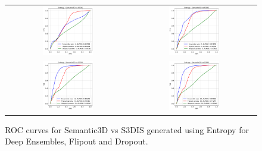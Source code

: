     \begin{figure}
        \centering
        \begin{tabular}{cc}
            \includegraphics[width = 0.42\textwidth, height= 0.3\textheight]{images/AUROC/Entropy_1.pdf} & 
            \includegraphics[width = 0.42\textwidth, height= 0.3\textheight]{images/AUROC/Entropy_5.pdf}\\ 
            
            \includegraphics[width = 0.42\textwidth, height= 0.3\textheight]{images/AUROC/Entropy_15.pdf} &
            \includegraphics[width = 0.42\textwidth, height= 0.3\textheight]{images/AUROC/Entropy_20.pdf} \\
        \end{tabular}
        \caption{ROC curves for Semantic3D vs S3DIS generated using Entropy for Deep Ensembles, Flipout and Dropout.}
        \label{fig:roc_ent_ood_1}
    \end{figure}

